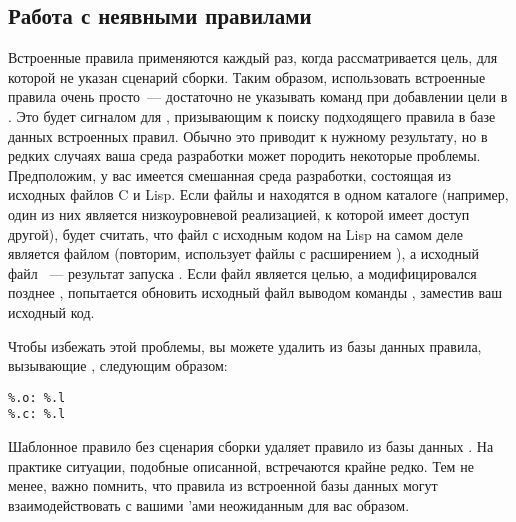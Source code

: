 \subsection{Работа с неявными правилами}
Встроенные правила применяются каждый раз, когда рассматривается цель,
для которой не указан сценарий сборки. Таким образом, использовать
встроенные правила очень просто~--- достаточно не указывать команд при
добавлении цели в \Makefile{}. Это будет сигналом для \GNUmake{},
призывающим к поиску подходящего правила в базе данных встроенных
правил. Обычно это приводит к нужному результату, но в редких случаях
ваша среда разработки может породить некоторые проблемы.  Предположим,
у вас имеется смешанная среда разработки, состоящая из исходных файлов
C и Lisp. Если файлы  и 
находятся в одном каталоге (например, один из них является
низкоуровневой реализацией, к которой имеет доступ другой), \GNUmake{}
будет считать, что файл с исходным кодом на Lisp на самом деле
является файлом  (повторим,  использует
файлы с расширением ), а исходный файл \Clang{}~---
результат запуска . Если файл 
является целью, а  модифицировался позднее
, \GNUmake{} попытается обновить исходный файл
\Clang{} выводом команды , заместив ваш исходный код.

Чтобы избежать этой проблемы, вы можете удалить из базы данных
правила, вызывающие , следующим образом:

{\footnotesize
\begin{verbatim}
%.o: %.l
%.c: %.l
\end{verbatim}
}

Шаблонное правило без сценария сборки удаляет правило из базы данных
\GNUmake{}. На практике ситуации, подобные описанной, встречаются
крайне редко. Тем не менее, важно помнить, что правила из встроенной
базы данных могут взаимодействовать с вашими \Makefile{}'ами
неожиданным для вас образом.

